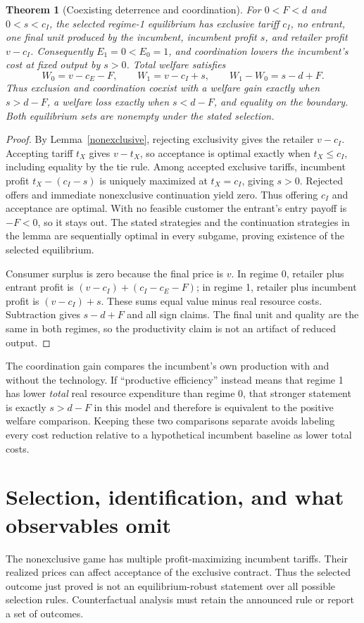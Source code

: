 \documentclass[11pt]{article}
\newtheorem{theorem}{Theorem}
\theoremstyle{remark}
\begin{document}
\begin{theorem}[Coexisting deterrence and coordination]\label{comparison}
For $0<F<d$ and $0<s<c_I$, the selected regime-1 equilibrium has
exclusive tariff $c_I$, no entrant, one final unit produced by the
incumbent, incumbent profit $s$, and retailer profit $v-c_I$.
Consequently $E_1=0<E_0=1$, and coordination lowers the incumbent's
cost at fixed output by $s>0$. Total welfare satisfies
\[
 W_0=v-c_E-F,\qquad W_1=v-c_I+s,
 \qquad W_1-W_0=s-d+F.
\]
Thus exclusion and coordination coexist with a welfare gain exactly
when $s>d-F$, a welfare loss exactly when $s<d-F$, and equality on the
boundary. Both equilibrium sets are nonempty under the stated selection.
\end{theorem}
\begin{proof}
By Lemma~\ref{nonexclusive}, rejecting exclusivity gives the retailer
$v-c_I$. Accepting tariff $t_X$ gives $v-t_X$, so acceptance is optimal
exactly when $t_X\leq c_I$, including equality by the tie rule. Among
accepted exclusive tariffs, incumbent profit
$t_X-(c_I-s)$ is uniquely maximized at $t_X=c_I$, giving $s>0$.
Rejected offers and immediate nonexclusive continuation yield zero.
Thus offering $c_I$ and acceptance are optimal. With no feasible
customer the entrant's entry payoff is $-F<0$, so it stays out. The
stated strategies and the continuation strategies in the lemma are
sequentially optimal in every subgame, proving existence of the selected
equilibrium.

Consumer surplus is zero because the final price is $v$. In regime 0,
retailer plus entrant profit is $(v-c_I)+(c_I-c_E-F)$; in regime 1,
retailer plus incumbent profit is $(v-c_I)+s$. These sums equal value
minus real resource costs. Subtraction gives $s-d+F$ and all sign
claims. The final unit and quality are the same in both regimes, so
the productivity claim is not an artifact of reduced output.
\end{proof}

The coordination gain compares the incumbent's own production with
and without the technology. If ``productive efficiency'' instead means
that regime 1 has lower \emph{total} real resource expenditure than
regime 0, that stronger statement is exactly $s>d-F$ in this model and
therefore is equivalent to the positive welfare comparison. Keeping
these two comparisons separate avoids labeling every cost reduction
relative to a hypothetical incumbent baseline as lower total costs.

\section{Selection, identification, and what observables omit}
The nonexclusive game has multiple profit-maximizing incumbent tariffs.
Their realized prices can affect acceptance of the exclusive contract.
Thus the selected outcome just proved is not an equilibrium-robust
statement over all possible selection rules. Counterfactual analysis
must retain the announced rule or report a set of outcomes.
\end{document}
